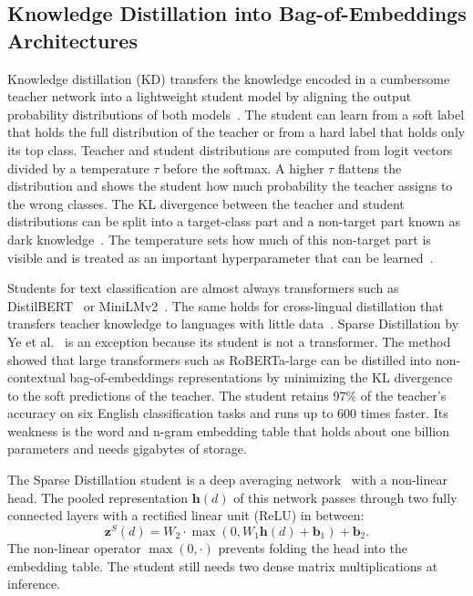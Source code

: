 \documentclass{ieeeaccess}
\begin{document}
\subsection{Knowledge Distillation into Bag-of-Embeddings Architectures}
\label{sec:rw-kd}
Knowledge distillation (KD) transfers the knowledge encoded in a cumbersome teacher network into a lightweight student model by aligning the output probability distributions of both models~\cite{hinton2015distilling,gou2021kdsurvey,gupta2022compression}. The student can learn from a soft label that holds the full distribution of the teacher or from a hard label that holds only its top class. Teacher and student distributions are computed from logit vectors divided by a temperature $\tau$ before the softmax. A higher $\tau$ flattens the distribution and shows the student how much probability the teacher assigns to the wrong classes. The KL divergence between the teacher and student distributions can be split into a target-class part and a non-target part known as dark knowledge~\cite{zhao2022dkd}. The temperature sets how much of this non-target part is visible and is treated as an important hyperparameter that can be learned~\cite{li2023ctkd}.

Students for text classification are almost always transformers such as DistilBERT~\cite{sanh2019distilbert} or MiniLMv2~\cite{wang2021minilmv2}. The same holds for cross-lingual distillation that transfers teacher knowledge to languages with little data~\cite{piperno2025crosslingual}. Sparse Distillation by Ye et al.~\cite{ye2022sparse} is an exception because its student is not a transformer. The method showed that large transformers such as RoBERTa-large can be distilled into non-contextual bag-of-embeddings representations by minimizing the KL divergence to the soft predictions of the teacher. The student retains 97\% of the teacher's accuracy on six English classification tasks and runs up to 600 times faster. Its weakness is the word and n-gram embedding table that holds about one billion parameters and needs gigabytes of storage.

The Sparse Distillation student is a deep averaging network~\cite{iyyer2015dan} with a non-linear head. The pooled representation $\mathbf{h}(d)$ of this network passes through two fully connected layers with a rectified linear unit (ReLU) in between:
\begin{equation}
\mathbf{z}^S(d)=W_2\cdot\max(0,W_1\mathbf{h}(d)+\mathbf{b}_1)+\mathbf{b}_2.
\label{eq:mlp}
\end{equation}
The non-linear operator $\max(0,\cdot)$ prevents folding the head into the embedding table. The student still needs two dense matrix multiplications at inference.
\end{document}
